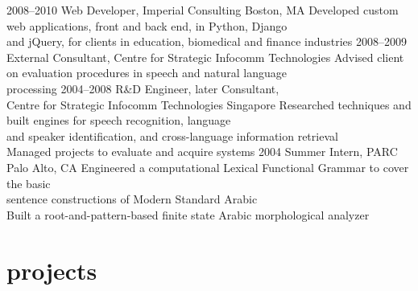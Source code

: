 \documentclass[]{friggeri-cv}
\begin{document}
\begin{entrylist}
  \entry
    {2008--2010}
    {Web Developer, Imperial Consulting}
    {Boston, MA}
    {
     \Squaredot Developed custom web applications, front and back end, in Python, Django \\ 
     \hspace*{3pt} and jQuery, for clients in education, biomedical and finance industries
    }
  \entry
    {2008--2009}
    {External Consultant, Centre for Strategic Infocomm Technologies}
    {}
    {\Squaredot Advised client on evaluation procedures in speech and natural language \\
     \hspace*{3pt} processing}
  \entry
    {2004--2008}
    {R\&D Engineer, later Consultant, \\ Centre for Strategic Infocomm Technologies}
    {Singapore}
    {\Squaredot Researched techniques and built engines for speech recognition, language \\
    \hspace*{3pt} and speaker identification, and cross-language information retrieval \\
    \Squaredot Managed projects to evaluate and acquire systems}
  \entry
    {2004}
    {Summer Intern, PARC}
    {Palo Alto, CA}
    {\Squaredot Engineered a computational Lexical Functional Grammar to cover the basic \\
     \hspace*{3pt} sentence constructions of Modern Standard Arabic \\
	\Squaredot Built a root-and-pattern-based finite state Arabic morphological analyzer}
\end{entrylist}

\section{projects}
\end{document}
